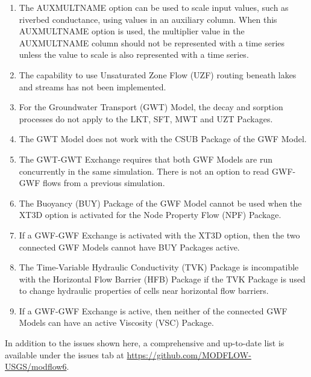 \documentclass[11pt,twoside,twocolumn]{usgsreport}
\begin{document}
\begin{enumerate}

\item
The AUXMULTNAME option can be used to scale input values, such as riverbed conductance, using values in an auxiliary column.  When this AUXMULTNAME option is used, the multiplier value in the AUXMULTNAME column should not be represented with a time series unless the value to scale is also represented with a time series.  

\item
The capability to use Unsaturated Zone Flow (UZF) routing beneath lakes and streams has not been implemented.

\item
For the Groundwater Transport (GWT) Model, the decay and sorption processes do not apply to the LKT, SFT, MWT and UZT Packages.

\item
The GWT Model does not work with the CSUB Package of the GWF Model.  

\item
The GWT-GWT Exchange requires that both GWF Models are run concurrently in the same simulation.  There is not an option to read GWF-GWF flows from a previous simulation.

\item
The Buoyancy (BUY) Package of the GWF Model cannot be used when the XT3D option is activated for the Node Property Flow (NPF) Package.

\item
If a GWF-GWF Exchange is activated with the XT3D option, then the two connected GWF Models cannot have BUY Packages active.

\item
The Time-Variable Hydraulic Conductivity (TVK) Package is incompatible with the Horizontal Flow Barrier (HFB) Package if the TVK Package is used to change hydraulic properties of cells near horizontal flow barriers.

\item
If a GWF-GWF Exchange is active, then neither of the connected GWF Models can have an active Viscosity (VSC) Package.

\end{enumerate}

In addition to the issues shown here, a comprehensive and up-to-date list is available under the issues tab at \url{https://github.com/MODFLOW-USGS/modflow6}.


\end{document}
